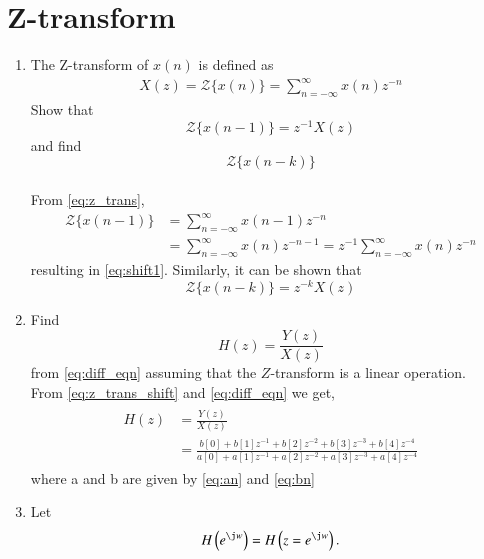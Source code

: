 \documentclass[journal,12pt,twocolumn]{IEEEtran}
\renewcommand\thesection{\arabic{section}}
\begin{document}
\section{Z-transform}
\begin{enumerate}[label=\thesection.\arabic*,ref=\thesection.\theenumi]
\item
\label{prob:Z-transform_formula}
%
The Z-transform of $x(n)$ is defined as
\begin{align}
\label{eq:z_trans}
X(z)={\mathcal {Z}}\{x(n)\}=\sum _{n=-\infty }^{\infty }x(n)z^{-n}
\end{align}
%
Show that
\begin{equation}
\label{eq:shift1}
{\mathcal {Z}}\{x(n-1)\} = z^{-1}X(z)
\end{equation}
and find
\begin{equation}
	{\mathcal {Z}}\{x(n-k)\} 
\end{equation}
\\
\solution From \eqref{eq:z_trans},
\begin{align}
{\mathcal {Z}}\{x(n-1)\} &=\sum _{n=-\infty }^{\infty }x(n-1)z^{-n}
\\
&=\sum _{n=-\infty }^{\infty }x(n)z^{-n-1} = z^{-1}\sum _{n=-\infty }^{\infty }x(n)z^{-n}
\end{align}
resulting in \eqref{eq:shift1}. Similarly, it can be shown that
%
\begin{equation}
\label{eq:z_trans_shift}
	{\mathcal {Z}}\{x(n-k)\} = z^{-k}X(z)
\end{equation}
\item Find
%
\begin{equation}
H(z) = \frac{Y(z)}{X(z)}
\end{equation}
%
from  \eqref{eq:diff_eqn} assuming that the $Z$-transform is a linear operation.
\\
\solution  From \eqref{eq:z_trans_shift} and \eqref{eq:diff_eqn} we get,
\begin{align}
\begin{split}
H(z) &= \frac{Y(z)}{X(z)}                
\\
&=\frac{b[0]+b[1]z^{-1}+b[2]z^{-2}+b[3]z^{-3}+b[4]z^{-4}}{a[0]+a[1]z^{-1}+a[2]z^{-2}+a[3]z^{-3}+a[4]z^{-4}}
\label{eq:freq_resp}
\end{split}
\end{align}
where a and b are given by \eqref{eq:an} and \eqref{eq:bn}
%
\item 
Let
\begin{equation}
H\brak{e^{\j w}} = H\brak{z = e^{\j w}}.
\end{equation}

\end{enumerate}
\end{document}
